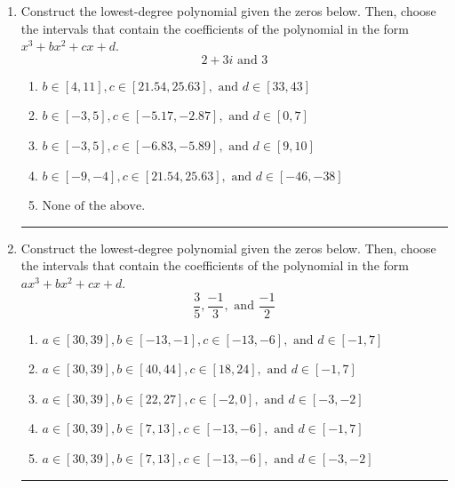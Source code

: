 \documentclass[14pt]{extbook}
\newcommand{\litem}[1]{\item#1\hspace*{-1cm}\rule{\textwidth}{0.4pt}}
\begin{document}
\begin{enumerate}
{\begin{enumerate}[label=\Alph*.]
\end{enumerate} }
\litem{
Construct the lowest-degree polynomial given the zeros below. Then, choose the intervals that contain the coefficients of the polynomial in the form $x^3+bx^2+cx+d$.\[ 2 + 3 i \text{ and } 3 \]\begin{enumerate}[label=\Alph*.]
\item \( b \in [4, 11], c \in [21.54, 25.63], \text{ and } d \in [33, 43] \)
\item \( b \in [-3, 5], c \in [-5.17, -2.87], \text{ and } d \in [0, 7] \)
\item \( b \in [-3, 5], c \in [-6.83, -5.89], \text{ and } d \in [9, 10] \)
\item \( b \in [-9, -4], c \in [21.54, 25.63], \text{ and } d \in [-46, -38] \)
\item \( \text{None of the above.} \)

\end{enumerate} }
\litem{
Construct the lowest-degree polynomial given the zeros below. Then, choose the intervals that contain the coefficients of the polynomial in the form $ax^3+bx^2+cx+d$.\[ \frac{3}{5}, \frac{-1}{3}, \text{ and } \frac{-1}{2} \]\begin{enumerate}[label=\Alph*.]
\item \( a \in [30, 39], b \in [-13, -1], c \in [-13, -6], \text{ and } d \in [-1, 7] \)
\item \( a \in [30, 39], b \in [40, 44], c \in [18, 24], \text{ and } d \in [-1, 7] \)
\item \( a \in [30, 39], b \in [22, 27], c \in [-2, 0], \text{ and } d \in [-3, -2] \)
\item \( a \in [30, 39], b \in [7, 13], c \in [-13, -6], \text{ and } d \in [-1, 7] \)
\item \( a \in [30, 39], b \in [7, 13], c \in [-13, -6], \text{ and } d \in [-3, -2] \)


\end{enumerate}}
\end{enumerate}
\end{document}
